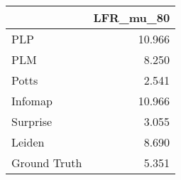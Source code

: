 \begin{tabular}{lr}
\toprule
{} & LFR_mu_80 \\
\midrule
PLP          &    10.966 \\
PLM          &     8.250 \\
Potts        &     2.541 \\
Infomap      &    10.966 \\
Surprise     &     3.055 \\
Leiden       &     8.690 \\
Ground Truth &     5.351 \\
\bottomrule
\end{tabular}
